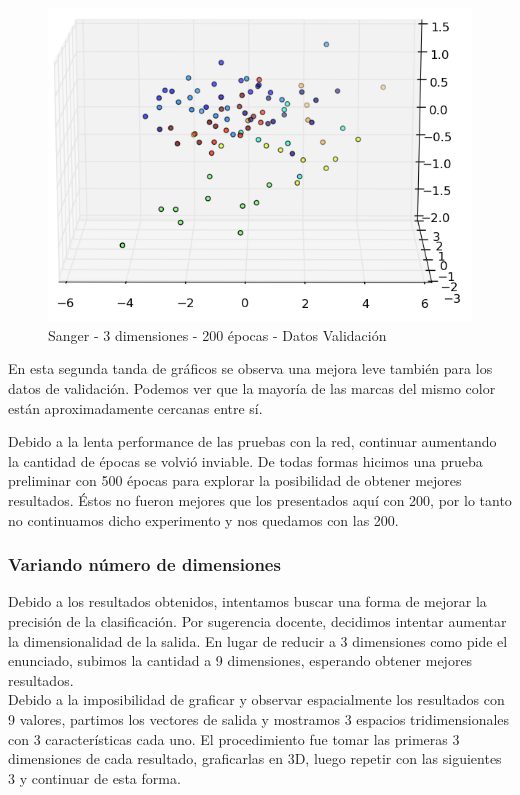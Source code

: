 \begin{figure}[h]
  \begin{center}
    \includegraphics[scale=0.4]{../img/ej1/sanger/sanger_3salida_200ep_validation_2.png}
  \caption{Sanger - 3 dimensiones - 200 épocas - Datos Validación}
  \end{center}
\end{figure}

En esta segunda tanda de gráficos se observa una mejora leve también para los datos de validación. Podemos ver que la mayoría de las marcas del mismo color están aproximadamente cercanas entre sí.

Debido a la lenta performance de las pruebas con la red, continuar aumentando la cantidad de épocas se volvió inviable. De todas formas hicimos una prueba preliminar con 500 épocas para explorar la posibilidad de obtener mejores resultados. Éstos no fueron mejores que los presentados aquí con 200, por lo tanto no continuamos dicho experimento y nos quedamos con las 200.

\subsubsection{Variando número de dimensiones}

Debido a los resultados obtenidos, intentamos buscar una forma de mejorar la precisión de la clasificación. Por sugerencia docente, decidimos intentar aumentar la dimensionalidad de la salida. En lugar de reducir a 3 dimensiones como pide el enunciado, subimos la cantidad a 9 dimensiones, esperando obtener mejores resultados. \\
Debido a la imposibilidad de graficar y observar espacialmente los resultados con 9 valores, partimos los vectores de salida y mostramos 3 espacios tridimensionales con 3 características cada uno. El procedimiento fue tomar las primeras 3 dimensiones de cada resultado, graficarlas en 3D, luego repetir con las siguientes 3 y continuar de esta forma.



